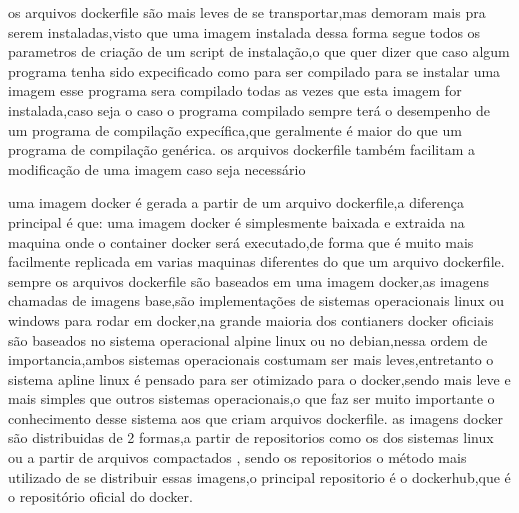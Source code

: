 \documentclass[
	12pt,				%
	openright,			%
	oneside,			%
	a4paper,			%
	english,			%
	french,				%
	spanish,			%
	brazil,				%
	]{abntex2}
\begin{document}
os arquivos dockerfile são mais leves de se transportar,mas demoram mais pra serem instaladas,visto que uma imagem instalada dessa forma segue todos os parametros de criação de um script de instalação,o que quer dizer que caso algum programa tenha sido expecificado como para ser compilado para se instalar uma imagem esse programa sera compilado todas as vezes que esta imagem for instalada,caso seja o caso o programa compilado sempre terá o desempenho de um programa de compilação expecífica,que geralmente é maior do que um programa de compilação genérica.
os arquivos dockerfile também facilitam a modificação de uma imagem caso seja necessário

uma imagem docker é gerada a partir de um arquivo dockerfile,a diferença principal é que: uma imagem docker é simplesmente baixada e extraida na maquina onde o container docker será executado,de forma que é muito mais facilmente replicada em varias maquinas diferentes do que um arquivo dockerfile.
sempre os arquivos dockerfile são baseados em uma imagem docker,as imagens chamadas de imagens base,são implementações de sistemas operacionais linux ou windows para rodar em docker,na grande maioria dos contianers docker oficiais são baseados no sistema operacional alpine linux ou no debian,nessa ordem de importancia,ambos sistemas operacionais costumam ser mais leves,entretanto o sistema apline linux é pensado para ser otimizado para o docker,sendo mais leve e mais simples que outros sistemas operacionais,o que faz ser muito importante o conhecimento desse sistema aos que criam arquivos dockerfile.
as imagens docker são distribuidas de 2 formas,a partir de repositorios como os dos sistemas linux ou a partir de arquivos compactados , sendo os repositorios o método mais utilizado de se distribuir essas imagens,o principal repositorio é o dockerhub,que é o repositório oficial do docker.


\end{document}
